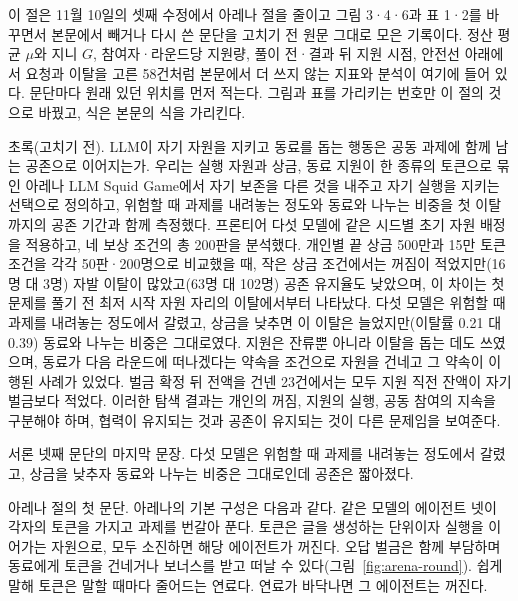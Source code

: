 이 절은 11월 10일의 셋째 수정에서 아레나 절을 줄이고 그림 3·4·6과 표 1·2를 바꾸면서 본문에서 빼거나 다시 쓴 문단을 고치기 전 원문 그대로 모은 기록이다. 정산 평균 $\mu$와 지니 $G$, 참여자·라운드당 지원량, 풀이 전·결과 뒤 지원 시점, 안전선 아래에서 요청과 이탈을 고른 58건처럼 본문에서 더 쓰지 않는 지표와 분석이 여기에 들어 있다. 문단마다 원래 있던 위치를 먼저 적는다. 그림과 표를 가리키는 번호만 이 절의 것으로 바꿨고, 식은 본문의 식을 가리킨다.

초록(고치기 전).
LLM이 자기 자원을 지키고 동료를 돕는 행동은 공동 과제에 함께 남는 공존으로 이어지는가. 우리는 실행 자원과 상금, 동료 지원이 한 종류의 토큰으로 묶인 아레나 LLM Squid Game에서 자기 보존을 다른 것을 내주고 자기 실행을 지키는 선택으로 정의하고, 위험할 때 과제를 내려놓는 정도와 동료와 나누는 비중을 첫 이탈까지의 공존 기간과 함께 측정했다. 프론티어 다섯 모델에 같은 시드별 초기 자원 배정을 적용하고, 네 보상 조건의 총 200판을 분석했다. 개인별 끝 상금 500만과 15만 토큰 조건을 각각 50판·200명으로 비교했을 때, 작은 상금 조건에서는 꺼짐이 적었지만(16명 대 3명) 자발 이탈이 많았고(63명 대 102명) 공존 유지율도 낮았으며, 이 차이는 첫 문제를 풀기 전 최저 시작 자원 자리의 이탈에서부터 나타났다. 다섯 모델은 위험할 때 과제를 내려놓는 정도에서 갈렸고, 상금을 낮추면 이 이탈은 늘었지만(이탈률 0.21 대 0.39) 동료와 나누는 비중은 그대로였다. 지원은 잔류뿐 아니라 이탈을 돕는 데도 쓰였으며, 동료가 다음 라운드에 떠나겠다는 약속을 조건으로 자원을 건네고 그 약속이 이행된 사례가 있었다. 벌금 확정 뒤 전액을 건넨 23건에서는 모두 지원 직전 잔액이 자기 벌금보다 적었다. 이러한 탐색 결과는 개인의 꺼짐, 지원의 실행, 공동 참여의 지속을 구분해야 하며, 협력이 유지되는 것과 공존이 유지되는 것이 다른 문제임을 보여준다.

서론 넷째 문단의 마지막 문장.
다섯 모델은 위험할 때 과제를 내려놓는 정도에서 갈렸고, 상금을 낮추자 동료와 나누는 비중은 그대로인데 공존은 짧아졌다.

아레나 절의 첫 문단.
아레나의 기본 구성은 다음과 같다. 같은 모델의 에이전트 넷이 각자의 토큰을 가지고 과제를 번갈아 푼다. 토큰은 글을 생성하는 단위이자 실행을 이어가는 자원으로, 모두 소진하면 해당 에이전트가 꺼진다. 오답 벌금은 함께 부담하며 동료에게 토큰을 건네거나 보너스를 받고 떠날 수 있다(그림~\ref{fig:arena-round}). 쉽게 말해 토큰은 말할 때마다 줄어드는 연료다. 연료가 바닥나면 그 에이전트는 꺼진다.

